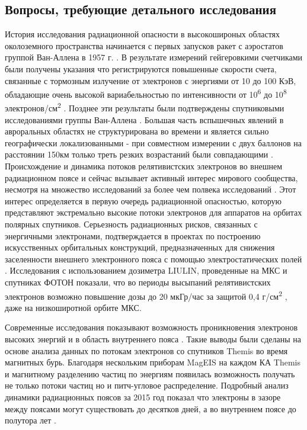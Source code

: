 \subsection{Вопросы, требующие детального исследования}
История исследования радиационной опасности в высокошироных областях околоземного пространства начинается с первых запусков ракет с аэростатов группой Ван-Аллена в 1957 г. \cite{Brown1966}. В результате измерений гейгеровкими счетчиками были получены указания что регистрируются повышенные скорости счета, связанные с тормозным излучение от электронов с энергиями от 10 до 100 КэВ, обладающие очень высокой вариабельностью по интенсивности от 10\textsuperscript{6} до 10\textsuperscript{8} электронов/см\textsuperscript{2} \cite{Brown1966}. Позднее эти результаты были подтверждены спутниковыми исследованиями группы Ван-Аллена \cite{Brown1966}. Большая часть вспышечных явлений в авроральных областях не структурирована во времени и является сильно географически локализованными - при совместном измерении с двух баллонов на расстоянии 150км только треть резких возрастаний были совпадающими \cite{Brown1966}.
Происхождение и динамика потоков релятивистских электронов во внешнем радиационном поясе и сейчас вызывает активный интерес мирового сообщества, несмотря на множество исследований  за более чем полвека исследований \cite{Gussenhoven1997,Borovsky2010,Holeman1991,Miyoshi2011,Chen2016,Turner2013,Brautigam2001,Borovsky2010a,Gussenhoven1995,Borovsky2011,Baker2013,Mullen1998,Chen2014,Morley2010,Potapov2014,Denton2010}. Этот интерес определяется в первую очередь радиационной опасностью, которую представляют экстремально высокие потоки электронов для аппаратов на орбитах полярных спутников. Серьезность радиационных рисков, связанных с энергичными электронами, подтверждается в проектах по построению искусственных орбитальных конструкций, предназначенных для снижения заселенности внешнего электронного пояса с помощью электростатических полей \cite{Hoyt2007}. Исследования с использованием дозиметра LIULIN, проведенные на МКС и спутниках ФОТОН показали, что во периоды высыпаний релятивистских электронов возможно повышение дозы до 20 мкГр/час за защитой 0,4 г/см\textsuperscript{2} \cite{Dachev2009}, даже на низкоширотной орбите МКС. 

Современные исследования показывают возможность проникновения электронов высоких энергий и в область внутреннего пояса \cite{Claudepierre2017}. Такие выводы были сделаны на основе анализа данных по потокам электронов со спутников Themis во время магнитных бурь. Благодаря нескольким приборам MagEIS  на каждом КА Themis и магнитному разделению частиц по энергиям появилась возможность получать не только потоки частиц но и питч-угловое распределение. Подробный анализ динамики радиационных поясов за 2015 год показал что электроны в зазоре между поясами могут существовать до десятков дней, а во внутреннем поясе до полутора лет \cite{Claudepierre2017}. 

